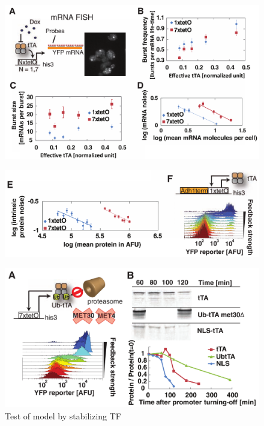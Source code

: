 \documentclass{beamer}
\begin{document}

 \begin{frame}
    \begin{figure}[ht!]
        \centering
        \includegraphics[width=.8\textwidth]{Tofig5.png}
        \label{fig:fig5to}
    \end{figure}
    \begin{figure}[ht!]
        \centering
        \includegraphics[width=.8\textwidth]{Tofig6.png}
        \label{fig:fig6to}
    \end{figure}
\end{frame}
 
 \begin{frame}
    \begin{figure}[ht!]
        \centering
        \includegraphics[width=.8\textwidth]{Tofig7.png}
        \caption{Test of model by stabilizing TF}
        \label{fig:fig7to}
    \end{figure}
\end{frame}
 
\end{document}
